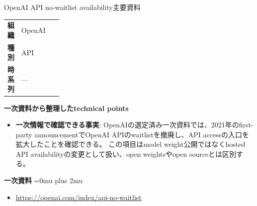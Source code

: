 \begin{technicalnote}{OpenAI API no-waitlist availability}{主要資料}
\begingroup
\begin{tabularx}{\linewidth}{@{}>{\bfseries}p{0.22\linewidth}X@{}}
組織 & OpenAI \\
種別 & API \\
時系列 & — \\
\end{tabularx}
\smallskip
{\bfseries 一次資料から整理したtechnical points}
\begin{itemize}[leftmargin=1.5em,itemsep=0.35em]
\item \textbf{一次情報で確認できる事実}: OpenAIの選定済み一次資料では、2021年のfirst-party announcementでOpenAI APIのwaitlistを撤廃し、API accessの入口を拡大したことを確認できる。 この項目はmodel weight公開ではなくhosted API availabilityの変更として扱い、open weightsやopen sourceとは区別する。
\end{itemize}
\begin{minipage}{\linewidth}
\begin{samepage}
{\bfseries 一次資料}
\begingroup\sloppy
\Urlmuskip=0mu plus 2mu\relax
\begin{itemize}[leftmargin=1.5em,itemsep=0.25em]
\item {\scriptsize\url{https://openai.com/index/api-no-waitlist}}
\end{itemize}
\endgroup
\end{samepage}
\end{minipage}
\endgroup
\end{technicalnote}
\medskip

